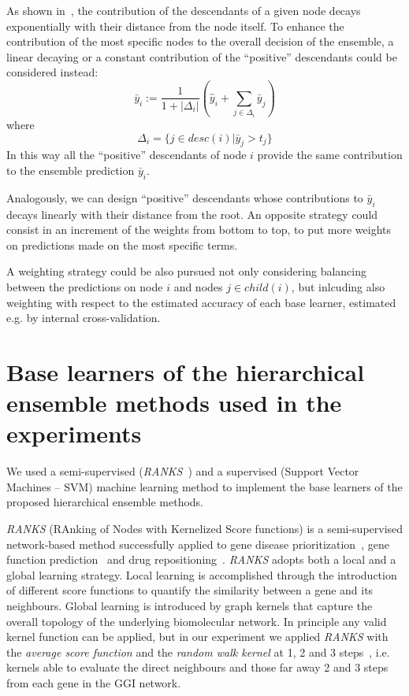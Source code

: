 \documentclass{bioinfo}
\begin{document}
As shown in~\cite{Vale11a}, the contribution of the descendants of a given node decays exponentially with their distance from the node itself.
To enhance the contribution of the most specific nodes to the overall decision of the ensemble, a linear decaying or a constant contribution of the ``positive'' descendants could be considered instead:
\begin{equation}
\bar{y}_i := \frac{1}{1 + |\Delta_i|} ( \hat{y}_i + \sum_{j \in \Delta_i} \bar{y}_j )
\label{eq:tpr-desc}
\end{equation}
where 
\begin{equation}
\Delta_i = \{ j \in desc(i) | \bar{y}_j > t_j \}
\label{eq:delta}
\end{equation}
In this way all the ``positive'' descendants of node $i$ provide the same contribution to the ensemble prediction $\bar{y}_i$.

Analogously, we can design ``positive'' descendants whose contributions to $\bar{y}_i$ decays linearly with their distance from the root.
An  opposite strategy could consist in an increment of the weights from bottom to top, to put more weights on predictions made on the most specific terms.

A weighting strategy could be also pursued not only considering balancing between the predictions on node $i$ and nodes $j \in child(i)$, but inlcuding also weighting with respect to the estimated accuracy of each base learner, estimated e.g. by internal cross-validation.


\section{Base learners of the hierarchical ensemble methods used in the experiments}
\label{sec:base-learners}

We used a semi-supervised  ({\em RANKS}~\citet{Vale16a}) and a supervised (Support Vector Machines -- SVM) machine learning method to implement the base learners of the proposed hierarchical ensemble methods.

{\em RANKS} (RAnking of Nodes with Kernelized Score functions) is a semi-supervised network-based method successfully applied to gene disease prioritization~\citep{Vale14e}, gene function prediction~\citep{Vale12c} and drug repositioning~\citep{Vale14a}. 
{\em RANKS} adopts both a local and a global learning strategy. Local learning is accomplished through the introduction of different score functions to quantify the similarity between a gene and its neighbours. Global learning is introduced by graph kernels that capture the overall topology of the underlying biomolecular network. In principle any valid kernel function can be applied, but in our experiment we applied {\em RANKS} with the {\it average score function} and the {\it random walk kernel} at 1, 2 and 3 steps~\citep{Smola03}, i.e. kernels able to evaluate the direct neighbours and those far away 2 and 3 steps from each gene in the GGI network.
\end{document}
